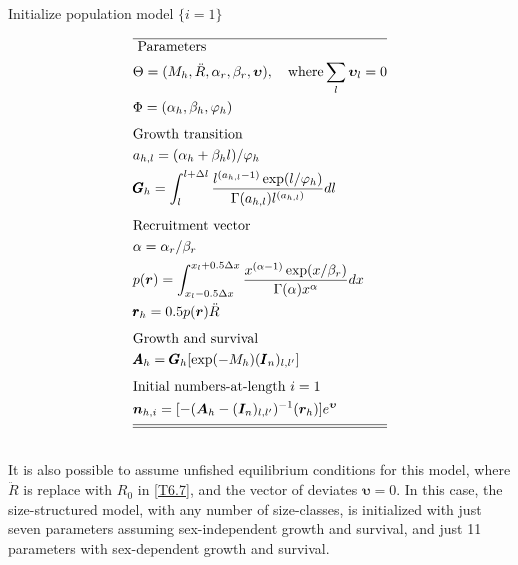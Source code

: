 \documentclass[12pt,letterpaper]{article}
\newcounter{saveEq}
\def\putEq{\setcounter{saveEq}{\value{equation}}}
\def\getEq{\setcounter{equation}{\value{saveEq}}}
\def\tableEq{ %
    \putEq \setcounter{equation}{0}
    \renewcommand{\theequation}{T\arabic{table}.\arabic{equation}}
    \vspace{-5mm}
    }
\def\normalEq{ %
    \getEq
    \renewcommand{\theequation}{\arabic{section}.\arabic{equation}}}
\begin{document}
      \begin{table}
      \centering
      \caption{ Initialize population model $\{i=1\}$ }
      \label{tab:initial_numbers}
      \tableEq
      \begin{align}
        \hline \nonumber
        &\mbox{ Parameters } \\
        &\Theta = (M_h,\ddot{R},\alpha_r,\beta_r, \bm{\upsilon})
        ,\quad\mbox{where} \sum_l \bm{\upsilon}_l = 0 \label{T6.1} \\
        &\Phi = (\alpha_h,\beta_h,\varphi_h)\\[1ex]
        &\mbox{Growth transition}\nonumber \\
        &a_{h,l} = (\alpha_h + \beta_h l)/\varphi_h \label{T6.3} \\
        &\pmb{G}_h= \int_{l}^{l+\Delta l}
        \frac{ l^{(a_{h,l}-1)} \exp(l/\varphi_h) }
        { \Gamma(a_{h,l}) l^{(a_{h,l})} } dl \label{T6.4} \\[1ex]
        &\mbox{Recruitment vector} \nonumber \\
        & \alpha = \alpha_r / \beta_r \label{T6.5} \\
        &p(\boldsymbol{r}) = \int_{x_l-0.5\Delta x}^{x_l+0.5\Delta x}
        \frac{x^{(\alpha-1)}\exp(x / \beta_r)}{\Gamma(\alpha)x^\alpha}dx
        \label{T6.6}\\
        &\pmb{r}_h = 0.5 p(\boldsymbol{r}) \ddot{R} \label{T6.7}\\[1ex]
         &\mbox{Growth and survival} \nonumber \\
        &\pmb{A}_h = \pmb{G}_h [\exp(-M_h) (\pmb{I}_n)_{l,l'}]\label{T6.8}\\[1ex]
        &\mbox{Initial numbers-at-length $i=1$} \nonumber \\
        &\bm{n}_{h,i} = [-(\bm{A}_h - (\bm{I}_n)_{l,l'})^{-1} (\bm{r}_h)] e^{\bm{\upsilon}} \label{T6.9}\\[1ex]
        \hline \hline \nonumber
      \end{align}
      \normalEq
      \end{table}

      It is also possible to assume unfished equilibrium conditions for this model, where $\ddot{R}$ is replace with $R_0$ in \eqref{T6.7}, and the vector of deviates $\bm{\upsilon} = 0$.  In this case, the size-structured model, with any number of size-classes, is initialized with just seven parameters assuming sex-independent growth and survival, and just 11 parameters with sex-dependent growth and survival.
\end{document}
